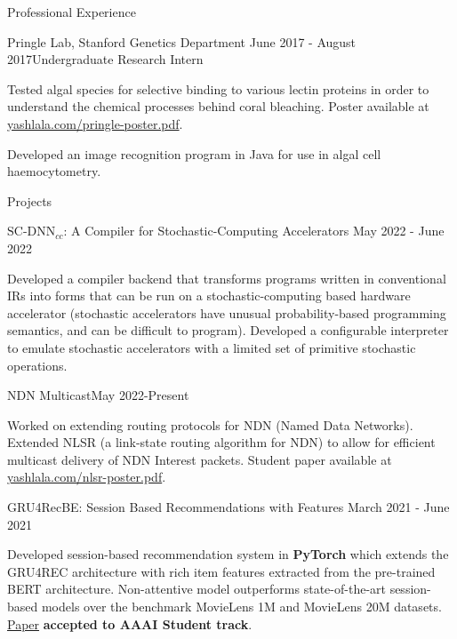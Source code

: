 \documentclass{resume} %
\begin{document}
\begin{resumeSection}{Professional Experience}
\begin{resumeSubsection}{Pringle Lab, Stanford Genetics Department}
	{June 2017 - August 2017}{Undergraduate Research Intern}{}
\item Tested algal species for selective binding to various lectin proteins in
	order to understand the chemical processes behind coral bleaching.
	Poster available at
	\href{https://yashlala.com/pringle-poster.pdf}{yashlala.com/pringle-poster.pdf}. 
\item Developed an image recognition program in Java for use in
	algal cell haemocytometry.
\end{resumeSubsection}

\end{resumeSection}


\begin{resumeSection}{Projects} \itemsep -10pt

\begin{resumeSubsection}
	{$\text{SC-DNN}_{cc}$: A Compiler for Stochastic-Computing Accelerators}
	{May 2022 - June 2022}{}{}
\item Developed a compiler backend that transforms programs written in
	conventional IRs into forms that can be run on a stochastic-computing
	based hardware accelerator (stochastic accelerators have unusual
	probability-based programming semantics, and can be difficult to
	program). Developed a configurable interpreter to emulate 
	stochastic accelerators with a limited set of primitive stochastic
	operations. 
\end{resumeSubsection}

\begin{resumeSubsection}{NDN Multicast}{May 2022-Present}{}{}
\item Worked on extending routing protocols for NDN (Named Data Networks). 
	Extended NLSR (a link-state routing algorithm for NDN) to allow for
	efficient multicast delivery of NDN Interest packets. 
	Student paper available at 
	\href{https://yashlala.com/nlsr-poster.pdf}{yashlala.com/nlsr-poster.pdf}. 
\end{resumeSubsection}

\begin{resumeSubsection}{GRU4RecBE: Session Based Recommendations with Features}
	{March 2021 - June 2021}{}{}
\item Developed session-based recommendation system in \textbf{PyTorch} which
	extends the GRU4REC architecture with rich item features extracted from
	the pre-trained BERT architecture. Non-attentive model outperforms
	state-of-the-art session-based models over the benchmark MovieLens 1M
	and MovieLens 20M datasets.
	\href{https://ojs.aaai.org/index.php/AAAI/article/view/21651/21400}{Paper}
	\textbf{accepted to AAAI Student track}.
\end{resumeSubsection}

\end{resumeSection}
\end{document}
